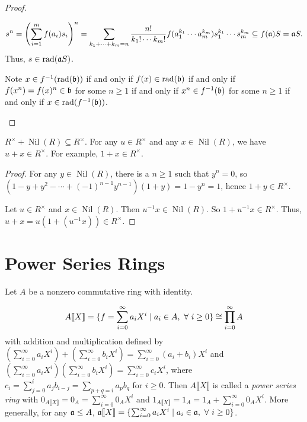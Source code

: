 \begin{proof}
\begin{enumerate}
            \[s^n = \left(\sum_{i=1}^m f(a_i)s_i\right)^n = \sum_{k_1 + \cdots + k_m = n} \frac{n!}{k_1! \cdots k_m!} f(a_1^{k_1} \cdots a_m^{k_m}) s_1^{k_1} \cdots s_m^{k_m} \subseteq f(\mathfrak{a})S = \mathfrak{a} S.\]
            Thus, $s \in \operatorname{rad}(\mathfrak{a} S)$. \par
            Note $x \in f^{-1}(\operatorname{rad}(\mathfrak{b}))$ if and only if $f(x) \in \operatorname{rad}(\mathfrak{b})$ if and only if $f(x^n) = f(x)^n \in \mathfrak{b}$ for some $n \geq 1$ if and only if $x^n  \in f^{-1}(\mathfrak{b})$ for some $n \geq 1$ if and only if $x \in \operatorname{rad}(f^{-1}(\mathfrak{b}))$. \qedhere
    \end{enumerate}
\end{proof}

\begin{proposition}
    $R^\times + \operatorname{Nil}(R) \subseteq R^\times$. For any $u \in R^\times$ and any $x \in \operatorname{Nil}(R)$, we have $u+x \in R^\times$. For example, $1+x \in R^\times$.
\end{proposition}

\begin{proof}
    For any $y \in \operatorname{Nil}(R)$, there is a $n \geq 1$ such that $y^n = 0$, so $(1-y+y^2-\cdots+(-1)^{n-1}y^{n-1})(1+y) = 1-y^n = 1$, hence $1+y \in R^\times$. \par 
    Let $u \in R^\times$ and $x \in \operatorname{Nil}(R)$. Then $u^{-1}x \in \operatorname{Nil}(R)$. So $1+u^{-1}x \in R^\times$. Thus, $u + x = u(1+(u^{-1}x)) \in R^\times$. 
\end{proof}

\section*{Power Series Rings}

Let $A$ be a nonzero commutative ring with identity.

\begin{definition}
    \[A \llbracket X \rrbracket = \{f = \sum_{i=0}^\infty a_iX^i \mid a_i \in A, \ \forall \  i \geq 0\} \cong \prod_{i=0}^\infty A\] 
    with addition and multiplication defined by $(\sum_{i=0}^\infty a_iX^i) + (\sum_{i=0}^\infty b_iX^i) = \sum_{i=0}^\infty (a_i+b_i)X^i$ and $(\sum_{i=0}^\infty a_iX^i)(\sum_{i=0}^\infty b_iX^i) = \sum_{i=0}^\infty c_iX^i$, where $c_i = \sum_{j=0}^i a_jb_{i-j} = \sum_{p+q = i}a_pb_q$ for $i \geq 0$. Then $A\llbracket X \rrbracket$ is called a \emph{power series ring} with $0_{A\llbracket X \rrbracket} = 0_A = \sum_{i=0}^\infty 0_AX^i$ and $1_{A\llbracket X \rrbracket} = 1_A = 1_A + \sum_{i=0}^\infty 0_A X^i$. More generally, for any $\mathfrak{a} \leq A$, $\mathfrak{a}\llbracket X \rrbracket = \{\sum_{i=0}^\infty a_iX^i \mid a_i \in \mathfrak{a}, \ \forall \  i \geq 0\}$.
\end{definition}

